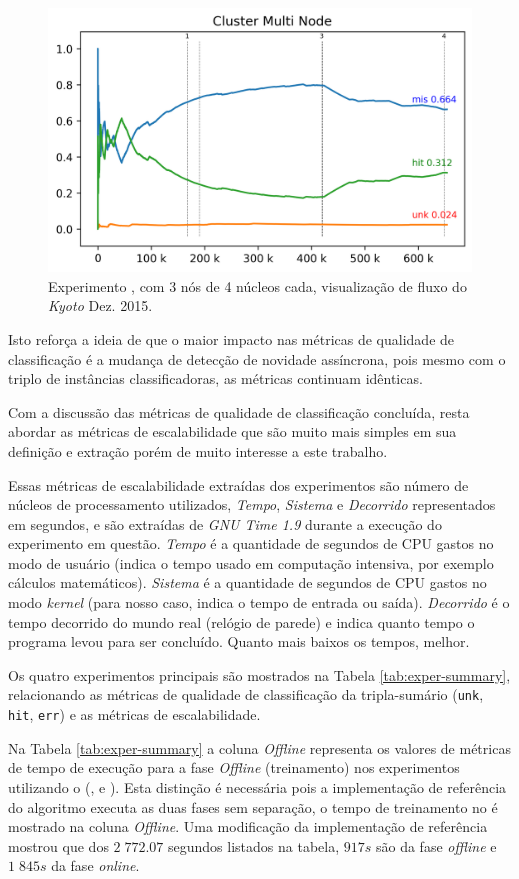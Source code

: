 \begin{figure}[htb]
  \centering
  \includegraphics[width=0.75\linewidth]{experiments/tmi-n12-log.png}
  \caption{Experimento \expD, \mfog com 3 nós de 4 núcleos cada, visualização de fluxo do \dataset \emph{Kyoto} Dez. 2015.}
  \label{fig:multi-flow}
\end{figure}

Isto reforça a ideia de que o maior impacto nas métricas de qualidade de
classificação é a mudança de detecção de novidade assíncrona, pois mesmo com o
triplo de instâncias classificadoras, as métricas continuam idênticas.

Com a discussão das métricas de qualidade de classificação concluída, resta
abordar as métricas de escalabilidade que são muito mais simples em sua
definição e extração porém de muito interesse a este trabalho.

Essas métricas de escalabilidade extraídas dos experimentos são número de núcleos de processamento
utilizados, \emph{Tempo}, \emph{Sistema} e \emph{Decorrido} representados em
segundos, e são extraídas de \emph{GNU Time 1.9} durante a execução do experimento
em questão.
\emph{Tempo} é a quantidade de segundos de CPU gastos no modo de usuário
(indica o tempo usado em computação intensiva, por exemplo cálculos matemáticos).
\emph{Sistema} é a quantidade de segundos de CPU gastos no modo \emph{kernel} (para
nosso caso, indica o tempo de entrada ou saída).
\emph{Decorrido} é o tempo decorrido do mundo real (relógio de parede) e indica
quanto tempo o programa levou para ser concluído.
Quanto mais baixos os tempos, melhor.

Os quatro experimentos principais são mostrados na Tabela
\ref{tab:exper-summary}, relacionando as métricas de qualidade de classificação
da tripla-sumário (\texttt{unk}, \texttt{hit}, \texttt{err}) e as métricas de
escalabilidade.

Na Tabela \ref{tab:exper-summary} a coluna \emph{Offline} representa os valores
de métricas de tempo de execução para a fase \emph{Offline} (treinamento) nos
experimentos utilizando o \mfog (\expB, \expC e \expD).
Esta distinção é necessária pois a implementação de referência do algoritmo
\minas executa as duas fases sem separação, o tempo de treinamento no \mfog é
mostrado na coluna \emph{Offline}.
Uma modificação da implementação de referência mostrou que dos $2\;772.07$
segundos listados na tabela, $917s$ são da fase \emph{offline} e $1\;845s$ da
fase \emph{online}.

